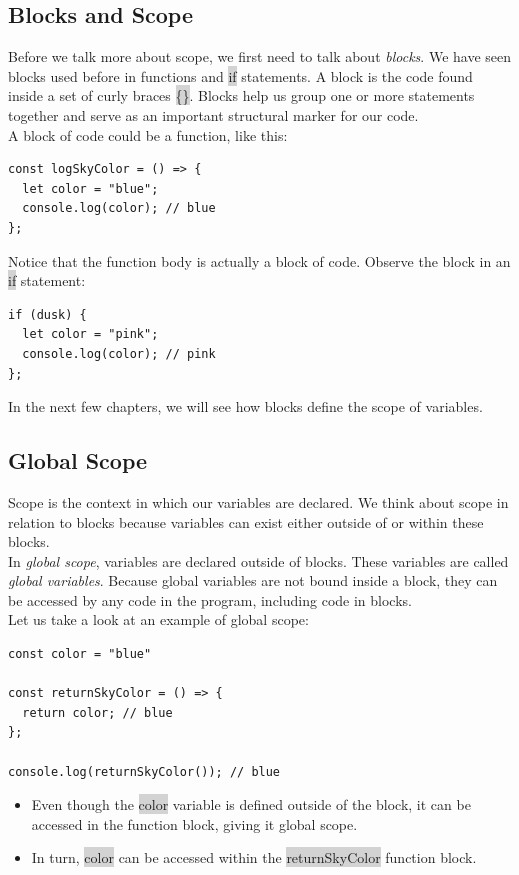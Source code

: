 \documentclass[11pt]{article}
\begin{document}
\subsection{Blocks and Scope}
Before we talk more about scope, we first need to talk about \textit{blocks}. We have seen blocks used before in functions and \colorbox{lightgray}{if} statements. A block is the code found inside a set of curly braces \colorbox{lightgray}{\{\}}. Blocks help us group one or more statements together and serve as an important structural marker for our code. \\
\newline
A block of code could be a function, like this: 
\begin{lstlisting}
const logSkyColor = () => {
  let color = "blue"; 
  console.log(color); // blue 
};
\end{lstlisting}
Notice that the function body is actually a block of code. Observe the block in an \colorbox{lightgray}{if} statement:
\begin{lstlisting}
if (dusk) {
  let color = "pink";
  console.log(color); // pink
};
\end{lstlisting}
In the next few chapters, we will see how blocks define the scope of variables.

\subsection{Global Scope}
Scope is the context in which our variables are declared. We think about scope in relation to blocks because variables can exist either outside of or within these blocks. \\
\newline
In \textit{global scope}, variables are declared outside of blocks. These variables are called \textit{global variables}. Because global variables are not bound inside a block, they can be accessed by any code in the program, including code in blocks. \\
\newpage
Let us take a look at an example of global scope:
\begin{lstlisting}
const color = "blue"

const returnSkyColor = () => {
  return color; // blue 
};

console.log(returnSkyColor()); // blue
\end{lstlisting}
\begin{itemize}[leftmargin = *]
\item Even though the \colorbox{lightgray}{color} variable is defined outside of the block, it can be accessed in the function block, giving it global scope.
\item In turn, \colorbox{lightgray}{color} can be accessed within the \colorbox{lightgray}{returnSkyColor} function block.
\end{itemize}
\end{document}
